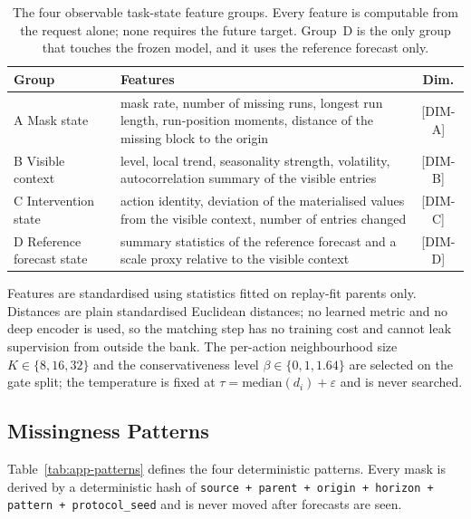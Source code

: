 \documentclass{article}
\newcommand{\ph}[1]{\textcolor{phgray}{\textsf{[#1]}}}
\begin{document}
\begin{table}[h]
  \caption{The four observable task-state feature groups. Every feature is computable from
  the request alone; none requires the future target. Group~D is the only group that
  touches the frozen model, and it uses the reference forecast only.}
  \label{tab:app-features}
  \centering
  \small
  \setlength{\tabcolsep}{4pt}
\begin{tabular}{@{}l p{} c@{}}
    \toprule
    Group & Features & Dim. \\
    \midrule
    A Mask state        & mask rate, number of missing runs, longest run length, run-position moments, distance of the missing block to the origin & \ph{DIM-A} \\
    B Visible context   & level, local trend, seasonality strength, volatility, autocorrelation summary of the visible entries & \ph{DIM-B} \\
    C Intervention state& action identity, deviation of the materialised values from the visible context, number of entries changed & \ph{DIM-C} \\
    D Reference forecast state & summary statistics of the reference forecast and a scale proxy relative to the visible context & \ph{DIM-D} \\
    \bottomrule
  \end{tabular}
\end{table}

Features are standardised using statistics fitted on replay-fit parents only. Distances are
plain standardised Euclidean distances; no learned metric and no deep encoder is used, so
the matching step has no training cost and cannot leak supervision from outside the bank.
The per-action neighbourhood size $K \in \{8, 16, 32\}$ and the conservativeness level
$\beta \in \{0, 1, 1.64\}$ are selected on the gate split; the temperature is fixed at
$\tau = \mathrm{median}(d_i) + \varepsilon$ and is never searched.

\subsection{Missingness Patterns}
\label{app:patterns}
Table~\ref{tab:app-patterns} defines the four deterministic patterns. Every mask is derived
by a deterministic hash of
\texttt{source + parent + origin + horizon + pattern + protocol\_seed} and is never moved
after forecasts are seen.
\end{document}
